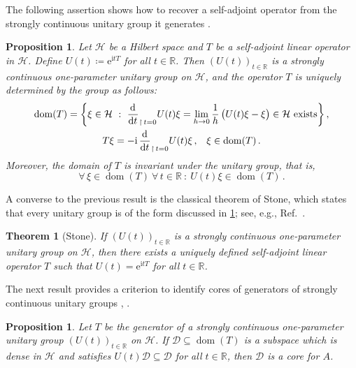 \documentclass[a4paper, twoside, 11pt, reqno]{amsart}
\theoremstyle{definition}
\theoremstyle{plain}
\newtheorem{theorem}[definition]{Theorem}
\newtheorem{proposition}[definition]{Proposition}
\renewcommand{\subset}{\subseteq}
\let\originalleft\left
\let\originalright\right
\renewcommand{\left}{\mathopen{}\mathclose\bgroup\originalleft}
\renewcommand{\right}{\aftergroup\egroup\originalright}
\newcommand{\R}{\mathbb{R}}
\newcommand{\MD}{\mathcal{D}}
\newcommand{\MH}{\mathcal{H}}
\newcommand{\ii}{\mathrm{i}}
\newcommand{\ee}{\mathrm{e}}
\newcommand{\1}{\mathbf{1}}
\newcommand{\diff}{\mathop{}\!\mathrm{d}}
\DeclareMathOperator{\dom}{dom}
\newcommand{\Set}[1]{\left\{#1\right\}}
\newcommand{\odbound}[4][]{\frac{\diff^{#1} #2}{\diff {#3}^{#1}}_{\upharpoonright \, #4}}
\newcommand{\ce}{\coloneqq}
\newcommand{\com}{{\, , \quad}}
\begin{document}
The following assertion shows how to recover a self-adjoint operator from the strongly continuous unitary group it generates \cite[Prop. 6.1]{Schmuedgen2012}.

\begin{proposition}\label{pro:generatorUnitaryGroup}
    Let $\MH$ be a Hilbert space and $T$ be a self-adjoint linear operator in $\MH$. Define $U(t) \ce \ee^{\ii t T}$ for all $t \in \R$. Then $(U(t))_{t \in \R}$ is a strongly continuous one-parameter unitary group on $\MH$, and the operator $T$ is uniquely determined by the group as follows:
    \begin{gather*}
        \dom(T) = \Set{\xi \in \MH \ : \ \odbound{}{t}{t=0} U(t) \xi = \lim_{h \to 0} \frac{1}{h} \, \bigl(U(t) \xi - \xi\bigr) \in \MH \ \text{exists}} \, , \\
        T \xi = - \ii \, \odbound{}{t}{t=0} U(t) \xi \com \xi \in \dom(T) \, .
    \end{gather*}
    Moreover, the domain of $T$ is invariant under the unitary group, that is,
    \begin{equation*}
        \forall \, \xi \in \dom(T) \ \forall \, t \in \R \ : \ U(t) \xi \in \dom(T) \, .
    \end{equation*}
\end{proposition}

A converse to the previous result is the classical theorem of Stone, which states that every unitary group is of the form discussed in \cref{pro:generatorUnitaryGroup}; see, e.g., Ref.~\cite[Thm. 6.2]{Schmuedgen2012}.

\begin{theorem}[Stone]\label{thm:Stone}
    If $(U(t))_{t \in \R}$ is a strongly continuous one-parameter unitary group on $\MH$, then there exists a uniquely defined self-adjoint linear operator $T$ such that $U(t) = \ee^{\ii t T}$ for all $t \in \R$.
\end{theorem}

The next result provides a criterion to identify cores of generators of strongly continuous unitary groups \cite[Prop. II.1.7]{EngelNagel2000}, \cite[Prop. 6.3]{Schmuedgen2012}.

\begin{proposition}\label{pro:coreGenerator}
    Let $T$ be the generator of a strongly continuous one-parameter unitary group $(U(t))_{t \in \R}$ on $\MH$. If $\MD \subset \dom(T)$ is a subspace which is dense in $\MH$ and satisfies $U(t) \MD \subset \MD$ for all $t \in \R$, then $\MD$ is a core for $A$.
\end{proposition}
\end{document}
